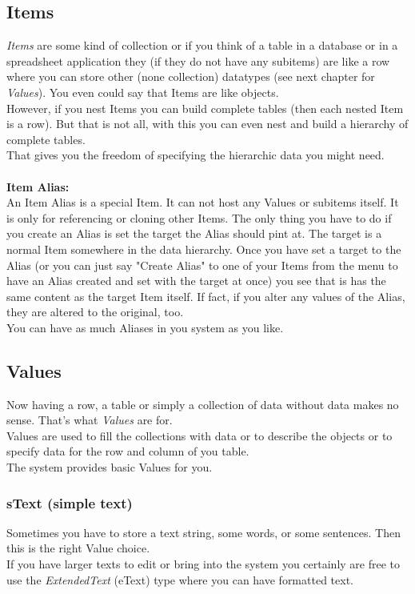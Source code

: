 \documentclass[12pt,a4]{article}
\begin{document}
\subsection{Items}
\label{items_datatype}
\medskip
\textit{Items} are some kind of collection or if you think of a table in a database or in a spreadsheet application they (if they do not have any subitems) are like a row where you can store other (none collection) datatypes (see next chapter for \textit{Values}). You even could say that Items are like objects. \\
However, if you nest Items you can build complete tables (then each nested Item is a row). But that is not all, with this you can even nest and build a hierarchy of complete tables. \\
That gives you the freedom of specifying the hierarchic data you might need. \\
\\
\textbf{Item Alias:} \\
An Item Alias is a special Item. It can not host any Values or subitems itself. It is only for referencing or cloning other Items. The only thing you have to do if you create an Alias is set the target the Alias should pint at. The target is a normal Item somewhere in the data hierarchy. Once you have set a target to the Alias (or you can just say "Create Alias" to one of your Items from the menu to have an Alias created and set with the target at once) you see that is has the same content as the target Item itself. If fact, if you alter any values of the Alias, they are altered to the original, too. \\
You can have as much Aliases in you system as you like.
\subsection{Values}
\label{itemvalues_datatype}
\medskip
Now having a row, a table or simply a collection of data without data makes no sense. That's what \textit{Values} are for. \\
Values are used to fill the collections with data or to describe the objects or to specify data for the row and column of you table. \\
The system provides basic Values for you.
\subsubsection{sText (simple text)}
\label{stext_datatype}
\medskip
Sometimes you have to store a text string, some words, or some sentences. Then this is the right Value choice. \\
If you have larger texts to edit or bring into the system you certainly are free to use the \textit{ExtendedText} (eText) type  where you can have formatted text.
\end{document}
